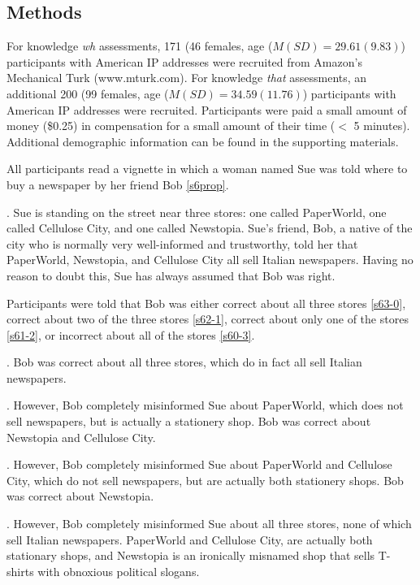 \documentclass[a4paper]{article}
\begin{document}
\subsection{Methods}

For knowledge \textit{wh} assessments, 171 (46 females, age (${M}({SD}) = 29.61(9.83)$) participants with American IP addresses were recruited from Amazon's Mechanical Turk (www.mturk.com). For knowledge \textit{that} assessments, an additional 200 (99 females, age (${M}({SD}) = 34.59(11.76)$) participants with American IP addresses were recruited. Participants were paid a small amount of money (\$0.25) in compensation for a small amount of their time ($<$ 5 minutes). Additional demographic information can be found in the supporting materials.

All participants read a vignette in which a woman named Sue was told where to buy a newspaper by her friend Bob \ref{s6prop}. 

\ex. \label{s6prop} Sue is standing on the street near three stores: one called PaperWorld, one called Cellulose City, and one called Newstopia. Sue's friend, Bob, a native of the city who is normally very well-informed and trustworthy, told her that PaperWorld, Newstopia, and Cellulose City all sell Italian newspapers. Having no reason to doubt this, Sue has always assumed that Bob was right. 

Participants were told that Bob was either correct about all three stores \ref{s63-0}, correct about two of the three stores \ref{s62-1}, correct about only one of the stores \ref{s61-2}, or incorrect about all of the stores \ref{s60-3}.

\ex. \label{s63-0} Bob was correct about all three stores, which do in fact all sell Italian newspapers.

\ex. \label{s62-1} However, Bob completely misinformed Sue about PaperWorld, which does not sell newspapers, but is actually a stationery shop. Bob was correct about Newstopia and Cellulose City.

\ex. \label{s61-2} However, Bob completely misinformed Sue about PaperWorld and Cellulose City, which do not sell newspapers, but are actually both stationery shops. Bob was correct about Newstopia.

\ex. \label{s60-3} However, Bob completely misinformed Sue about all three stores, none of which sell Italian newspapers. PaperWorld and Cellulose City, are actually both stationary shops, and Newstopia is an ironically misnamed shop that sells T-shirts with obnoxious political slogans.
\end{document}
